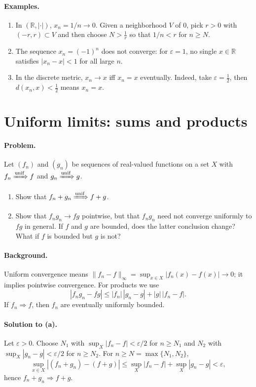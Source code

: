 \documentclass[12pt,a4paper]{article}
\begin{document}
\paragraph{Examples.}
\begin{enumerate}
\item In $(\mathbb{R},|\cdot|)$, $x_n=1/n\to 0$. Given a neighborhood $V$ of $0$, pick $r>0$ with $(-r,r)\subset V$ and then choose $N>\tfrac{1}{r}$ so that $1/n<r$ for $n\ge N$.
\item The sequence $x_n=(-1)^n$ does not converge: for $\varepsilon=1$, no single $x\in\mathbb{R}$ satisfies $|x_n-x|<1$ for all large $n$.
\item In the discrete metric, $x_n\to x$ iff $x_n=x$ eventually. Indeed, take $\varepsilon=\tfrac12$, then $d(x_n,x)<\tfrac12$ means $x_n=x$.
\end{enumerate}
	
	
\section*{Uniform limits: sums and products}

\paragraph{Problem.}
Let $(f_n)$ and $(g_n)$ be sequences of real-valued functions on a set $X$ with
$f_n \xRightarrow{\text{\rm unif}} f$ and $g_n \xRightarrow{\text{\rm unif}} g$.
\begin{enumerate}[label=(\alph*)]
\item Show that $f_n+g_n \xRightarrow{\text{\rm unif}} f+g$.
\item Show that $f_n g_n \to fg$ pointwise, but that $f_n g_n$ need not converge uniformly to $fg$ in general. If $f$ and $g$ are bounded, does the latter conclusion change? What if $f$ is bounded but $g$ is not?
\end{enumerate}

\paragraph{Background.}
Uniform convergence means $\|f_n-f\|_\infty=\sup_{x\in X}|f_n(x)-f(x)|\to 0$; it implies pointwise convergence. For products we use
\[
|f_n g_n - fg| \le |f_n|\,|g_n-g| + |g|\,|f_n-f|.
\]
If $f_n\Rightarrow f$, then $f_n$ are eventually uniformly bounded.

\paragraph{Solution to (a).}
Let $\varepsilon>0$. Choose $N_1$ with $\sup_X|f_n-f|<\varepsilon/2$ for $n\ge N_1$ and $N_2$ with $\sup_X|g_n-g|<\varepsilon/2$ for $n\ge N_2$. For $n\ge N=\max\{N_1,N_2\}$,
\[
\sup_{x\in X}|(f_n+g_n)-(f+g)| \le \sup_X|f_n-f|+\sup_X|g_n-g| < \varepsilon,
\]
hence $f_n+g_n \Rightarrow f+g$.
\end{document}
